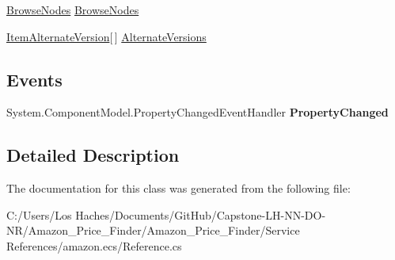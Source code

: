 \begin{DoxyCompactItemize}
\begin{DoxyCompactList}\small\item\em \end{DoxyCompactList}\item 
\hypertarget{class_amazon___price___finder_1_1amazon_1_1ecs_1_1_item_aa442dc0428cb6ac3938bb3b31fc78b92}{\hyperlink{class_amazon___price___finder_1_1amazon_1_1ecs_1_1_browse_nodes}{Browse\-Nodes} \hyperlink{class_amazon___price___finder_1_1amazon_1_1ecs_1_1_item_aa442dc0428cb6ac3938bb3b31fc78b92}{Browse\-Nodes}}\label{class_amazon___price___finder_1_1amazon_1_1ecs_1_1_item_aa442dc0428cb6ac3938bb3b31fc78b92}

\begin{DoxyCompactList}\small\item\em \end{DoxyCompactList}\item 
\hypertarget{class_amazon___price___finder_1_1amazon_1_1ecs_1_1_item_a6e8afb96214937db787997666a23c8d2}{\hyperlink{class_amazon___price___finder_1_1amazon_1_1ecs_1_1_item_alternate_version}{Item\-Alternate\-Version}\mbox{[}$\,$\mbox{]} \hyperlink{class_amazon___price___finder_1_1amazon_1_1ecs_1_1_item_a6e8afb96214937db787997666a23c8d2}{Alternate\-Versions}}\label{class_amazon___price___finder_1_1amazon_1_1ecs_1_1_item_a6e8afb96214937db787997666a23c8d2}

\begin{DoxyCompactList}\small\item\em \end{DoxyCompactList}\end{DoxyCompactItemize}
\subsection*{Events}
\begin{DoxyCompactItemize}
\item 
\hypertarget{class_amazon___price___finder_1_1amazon_1_1ecs_1_1_item_ae400c83f375260c619c985c81f68a2fc}{System.\-Component\-Model.\-Property\-Changed\-Event\-Handler {\bfseries Property\-Changed}}\label{class_amazon___price___finder_1_1amazon_1_1ecs_1_1_item_ae400c83f375260c619c985c81f68a2fc}

\end{DoxyCompactItemize}


\subsection{Detailed Description}


The documentation for this class was generated from the following file\-:\begin{DoxyCompactItemize}
\item 
C\-:/\-Users/\-Los Haches/\-Documents/\-Git\-Hub/\-Capstone-\/\-L\-H-\/\-N\-N-\/\-D\-O-\/\-N\-R/\-Amazon\-\_\-\-Price\-\_\-\-Finder/\-Amazon\-\_\-\-Price\-\_\-\-Finder/\-Service References/amazon.\-ecs/Reference.\-cs\end{DoxyCompactItemize}
